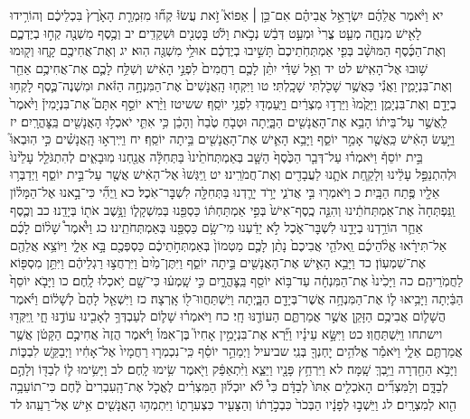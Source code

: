 \documentclass[twoside, openany, parskip=half, 11pt]{book}
\begin{document}
יא וַיֹּ֨אמֶר אֲלֵהֶ֜ם יִשְׂרָאֵ֣ל אֲבִיהֶ֗ם אִם־כֵּ֣ן ׀ אֵפוֹא֮ זֹ֣את עֲשׂוּ֒ קְח֞וּ מִזִּמְרַ֤ת הָאָ֙רֶץ֙ בִּכְלֵיכֶ֔ם וְהוֹרִ֥ידוּ לָאִ֖ישׁ מִנְחָ֑ה מְעַ֤ט צֳרִי֙ וּמְעַ֣ט דְּבַ֔שׁ נְכֹ֣את וָלֹ֔ט בׇּטְנִ֖ים וּשְׁקֵדִֽים׃ יב וְכֶ֥סֶף מִשְׁנֶ֖ה קְח֣וּ בְיֶדְכֶ֑ם וְאֶת־הַכֶּ֜סֶף הַמּוּשָׁ֨ב בְּפִ֤י אַמְתְּחֹֽתֵיכֶם֙ תָּשִׁ֣יבוּ בְיֶדְכֶ֔ם אוּלַ֥י מִשְׁגֶּ֖ה הֽוּא׃ יג וְאֶת־אֲחִיכֶ֖ם קָ֑חוּ וְק֖וּמוּ שׁ֥וּבוּ אֶל־הָאִֽישׁ׃ לט יד וְאֵ֣ל שַׁדַּ֗י יִתֵּ֨ן לָכֶ֤ם רַחֲמִים֙ לִפְנֵ֣י הָאִ֔ישׁ וְשִׁלַּ֥ח לָכֶ֛ם אֶת־אֲחִיכֶ֥ם אַחֵ֖ר וְאֶת־בִּנְיָמִ֑ין וַאֲנִ֕י כַּאֲשֶׁ֥ר שָׁכֹ֖לְתִּי שָׁכָֽלְתִּי׃ טו וַיִּקְח֤וּ הָֽאֲנָשִׁים֙ אֶת־הַמִּנְחָ֣ה הַזֹּ֔את וּמִשְׁנֶה־כֶּ֛סֶף לָקְח֥וּ בְיָדָ֖ם וְאֶת־בִּנְיָמִ֑ן וַיָּקֻ֙מוּ֙ וַיֵּרְד֣וּ מִצְרַ֔יִם וַיַּֽעַמְד֖וּ לִפְנֵ֥י יוֹסֵֽף׃ ששיטז וַיַּ֨רְא יוֹסֵ֣ף אִתָּם֮ אֶת־בִּנְיָמִין֒ וַיֹּ֙אמֶר֙ לַֽאֲשֶׁ֣ר עַל־בֵּית֔וֹ הָבֵ֥א אֶת־הָאֲנָשִׁ֖ים הַבָּ֑יְתָה וּטְבֹ֤חַ טֶ֙בַח֙ וְהָכֵ֔ן כִּ֥י אִתִּ֛י יֹאכְל֥וּ הָאֲנָשִׁ֖ים בַּֽצׇּהֳרָֽיִם׃ יז וַיַּ֣עַשׂ הָאִ֔ישׁ כַּֽאֲשֶׁ֖ר אָמַ֣ר יוֹסֵ֑ף וַיָּבֵ֥א הָאִ֛ישׁ אֶת־הָאֲנָשִׁ֖ים בֵּ֥יתָה יוֹסֵֽף׃ יח וַיִּֽירְא֣וּ הָֽאֲנָשִׁ֗ים כִּ֣י הֽוּבְאוּ֮ בֵּ֣ית יוֹסֵף֒ וַיֹּאמְר֗וּ עַל־דְּבַ֤ר הַכֶּ֙סֶף֙ הַשָּׁ֤ב בְּאַמְתְּחֹתֵ֙ינוּ֙ בַּתְּחִלָּ֔ה אֲנַ֖חְנוּ מֽוּבָאִ֑ים לְהִתְגֹּלֵ֤ל עָלֵ֙ינוּ֙ וּלְהִתְנַפֵּ֣ל עָלֵ֔ינוּ וְלָקַ֧חַת אֹתָ֛נוּ לַעֲבָדִ֖ים וְאֶת־חֲמֹרֵֽינוּ׃ יט וַֽיִּגְּשׁוּ֙ אֶל־הָאִ֔ישׁ אֲשֶׁ֖ר עַל־בֵּ֣ית יוֹסֵ֑ף וַיְדַבְּר֥וּ אֵלָ֖יו פֶּ֥תַח הַבָּֽיִת׃ כ וַיֹּאמְר֖וּ בִּ֣י אֲדֹנִ֑י יָרֹ֥ד יָרַ֛דְנוּ בַּתְּחִלָּ֖ה לִשְׁבׇּר־אֹֽכֶל׃ כא וַֽיְהִ֞י כִּי־בָ֣אנוּ אֶל־הַמָּל֗וֹן וַֽנִּפְתְּחָה֙ אֶת־אַמְתְּחֹתֵ֔ינוּ וְהִנֵּ֤ה כֶֽסֶף־אִישׁ֙ בְּפִ֣י אַמְתַּחְתּ֔וֹ כַּסְפֵּ֖נוּ בְּמִשְׁקָל֑וֹ וַנָּ֥שֶׁב אֹת֖וֹ בְּיָדֵֽנוּ׃ כב וְכֶ֧סֶף אַחֵ֛ר הוֹרַ֥דְנוּ בְיָדֵ֖נוּ לִשְׁבׇּר־אֹ֑כֶל לֹ֣א יָדַ֔עְנוּ מִי־שָׂ֥ם כַּסְפֵּ֖נוּ בְּאַמְתְּחֹתֵֽינוּ׃ כג וַיֹּ֩אמֶר֩ שָׁל֨וֹם לָכֶ֜ם אַל־תִּירָ֗אוּ אֱלֹ֨הֵיכֶ֜ם וֵֽאלֹהֵ֤י אֲבִיכֶם֙ נָתַ֨ן לָכֶ֤ם מַטְמוֹן֙ בְּאַמְתְּחֹ֣תֵיכֶ֔ם כַּסְפְּכֶ֖ם בָּ֣א אֵלָ֑י וַיּוֹצֵ֥א אֲלֵהֶ֖ם אֶת־שִׁמְעֽוֹן׃ כד וַיָּבֵ֥א הָאִ֛ישׁ אֶת־הָאֲנָשִׁ֖ים בֵּ֣יתָה יוֹסֵ֑ף וַיִּתֶּן־מַ֙יִם֙ וַיִּרְחֲצ֣וּ רַגְלֵיהֶ֔ם וַיִּתֵּ֥ן מִסְפּ֖וֹא לַחֲמֹֽרֵיהֶֽם׃ כה וַיָּכִ֙ינוּ֙ אֶת־הַמִּנְחָ֔ה עַד־בּ֥וֹא יוֹסֵ֖ף בַּֽצׇּהֳרָ֑יִם כִּ֣י שָֽׁמְע֔וּ כִּי־שָׁ֖ם יֹ֥אכְלוּ לָֽחֶם׃ כו וַיָּבֹ֤א יוֹסֵף֙ הַבַּ֔יְתָה וַיָּבִ֥יאּוּ ל֛וֹ אֶת־הַמִּנְחָ֥ה אֲשֶׁר־בְּיָדָ֖ם הַבָּ֑יְתָה וַיִּשְׁתַּחֲווּ־ל֖וֹ אָֽרְצָה׃ כז וַיִּשְׁאַ֤ל לָהֶם֙ לְשָׁל֔וֹם וַיֹּ֗אמֶר הֲשָׁל֛וֹם אֲבִיכֶ֥ם הַזָּקֵ֖ן אֲשֶׁ֣ר אֲמַרְתֶּ֑ם הַעוֹדֶ֖נּוּ חָֽי׃ כח וַיֹּאמְר֗וּ שָׁל֛וֹם לְעַבְדְּךָ֥ לְאָבִ֖ינוּ עוֹדֶ֣נּוּ חָ֑י וַֽיִּקְּד֖וּ וישתחו וַיִּֽשְׁתַּחֲוֽוּ׃ כט וַיִּשָּׂ֣א עֵינָ֗יו וַיַּ֞רְא אֶת־בִּנְיָמִ֣ין אָחִיו֮ בֶּן־אִמּוֹ֒ וַיֹּ֗אמֶר הֲזֶה֙ אֲחִיכֶ֣ם הַקָּטֹ֔ן אֲשֶׁ֥ר אֲמַרְתֶּ֖ם אֵלָ֑י וַיֹּאמַ֕ר אֱלֹהִ֥ים יׇחְנְךָ֖ בְּנִֽי׃ שביעיל וַיְמַהֵ֣ר יוֹסֵ֗ף כִּֽי־נִכְמְר֤וּ רַחֲמָיו֙ אֶל־אָחִ֔יו וַיְבַקֵּ֖שׁ לִבְכּ֑וֹת וַיָּבֹ֥א הַחַ֖דְרָה וַיֵּ֥בְךְּ שָֽׁמָּה׃ לא וַיִּרְחַ֥ץ פָּנָ֖יו וַיֵּצֵ֑א וַיִּ֨תְאַפַּ֔ק וַיֹּ֖אמֶר שִׂ֥ימוּ לָֽחֶם׃ לב וַיָּשִׂ֥ימוּ ל֛וֹ לְבַדּ֖וֹ וְלָהֶ֣ם לְבַדָּ֑ם וְלַמִּצְרִ֞ים הָאֹכְלִ֤ים אִתּוֹ֙ לְבַדָּ֔ם כִּי֩ לֹ֨א יוּכְל֜וּן הַמִּצְרִ֗ים לֶאֱכֹ֤ל אֶת־הָֽעִבְרִים֙ לֶ֔חֶם כִּי־תוֹעֵבָ֥ה הִ֖וא לְמִצְרָֽיִם׃ לג וַיֵּשְׁב֣וּ לְפָנָ֔יו הַבְּכֹר֙ כִּבְכֹ֣רָת֔וֹ וְהַצָּעִ֖יר כִּצְעִרָת֑וֹ וַיִּתְמְה֥וּ הָאֲנָשִׁ֖ים אִ֥ישׁ אֶל־רֵעֵֽהוּ׃ לד 
\end{document}
